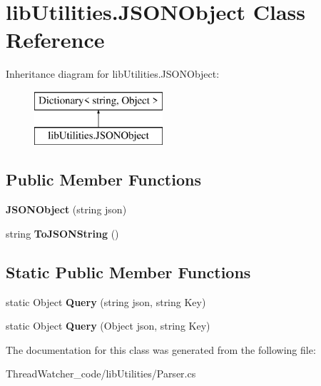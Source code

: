 \hypertarget{classlib_utilities_1_1_j_s_o_n_object}{\section{lib\+Utilities.\+J\+S\+O\+N\+Object Class Reference}
\label{classlib_utilities_1_1_j_s_o_n_object}
}
Inheritance diagram for lib\+Utilities.\+J\+S\+O\+N\+Object\+:\begin{figure}[H]
\begin{center}
\leavevmode
\includegraphics[height=2.000000cm]{classlib_utilities_1_1_j_s_o_n_object}
\end{center}
\end{figure}
\subsection*{Public Member Functions}
\begin{DoxyCompactItemize}
\item 
\hypertarget{classlib_utilities_1_1_j_s_o_n_object_a9ccd5834624a145a33e36657502eb946}{{\bfseries J\+S\+O\+N\+Object} (string json)}\label{classlib_utilities_1_1_j_s_o_n_object_a9ccd5834624a145a33e36657502eb946}

\item 
\hypertarget{classlib_utilities_1_1_j_s_o_n_object_ad046f5af39eb43c0c44ba2ab37acfe0b}{string {\bfseries To\+J\+S\+O\+N\+String} ()}\label{classlib_utilities_1_1_j_s_o_n_object_ad046f5af39eb43c0c44ba2ab37acfe0b}

\end{DoxyCompactItemize}
\subsection*{Static Public Member Functions}
\begin{DoxyCompactItemize}
\item 
\hypertarget{classlib_utilities_1_1_j_s_o_n_object_aa6c4c27fccab50b31aa0efd46c5e0640}{static Object {\bfseries Query} (string json, string Key)}\label{classlib_utilities_1_1_j_s_o_n_object_aa6c4c27fccab50b31aa0efd46c5e0640}

\item 
\hypertarget{classlib_utilities_1_1_j_s_o_n_object_a9deff3e6f1fd4cc44a16e23f74065bce}{static Object {\bfseries Query} (Object json, string Key)}\label{classlib_utilities_1_1_j_s_o_n_object_a9deff3e6f1fd4cc44a16e23f74065bce}

\end{DoxyCompactItemize}


The documentation for this class was generated from the following file\+:\begin{DoxyCompactItemize}
\item 
Thread\+Watcher\+\_\+code/lib\+Utilities/Parser.\+cs\end{DoxyCompactItemize}

